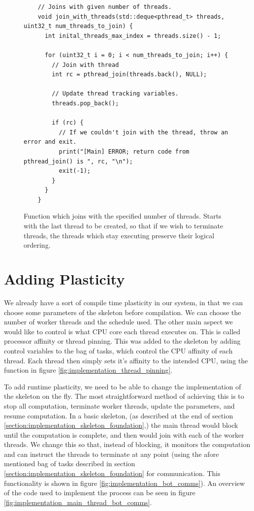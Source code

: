 \begin{figure}
	\begin{lstlisting}
	// Joins with given number of threads. 
	void join_with_threads(std::deque<pthread_t> threads, uint32_t num_threads_to_join) {
	  int inital_threads_max_index = threads.size() - 1;

	  for (uint32_t i = 0; i < num_threads_to_join; i++) {
	    // Join with thread
	    int rc = pthread_join(threads.back(), NULL);

	    // Update thread tracking variables.
	    threads.pop_back();

	    if (rc) {
	      // If we couldn't join with the thread, throw an error and exit.
	      print("[Main] ERROR; return code from pthread_join() is ", rc, "\n");
	      exit(-1);
	    }
	  }
	}
	\end{lstlisting}

	\caption{Function which joins with the specified number of threads. Starts with the last thread to be created, so that if we wish to terminate threads, the threads which stay executing preserve their logical ordering.}
	\label{fig:implementation_join_threads}
\end{figure}



\section{Adding Plasticity}
\label{section:implementation_adding_plasticity}

We already have a sort of compile time plasticity in our system, in that we can choose some parameters of the skeleton before compilation. We can choose the number of worker threads and the schedule used. The other main aspect we would like to control is what CPU core each thread executes on. This is called processor affinity or thread pinning. This was added to the skeleton by adding control variables to the bag of tasks, which control the CPU affinity of each thread. Each thread then simply sets it's affinity to the intended CPU, using the function in figure \ref{fig:implementation_thread_pinning}.

To add runtime plasticity, we need to be able to change the implementation of the skeleton on the fly. The most straightforward method of achieving this is to stop all computation, terminate worker threads, update the parameters, and resume computation. In a basic skeleton, (as described at the end of section \ref{section:implementation_skeleton_foundation},) the main thread would block until the computation is complete, and then would join with each of the worker threads. We change this so that, instead of blocking, it monitors the computation and can instruct the threads to terminate at any point (using the afore mentioned bag of tasks described in section \ref{section:implementation_skeleton_foundation} for communication. This functionality is shown in figure \ref{fig:implementation_bot_comms}). An overview of the code used to implement the process can be seen in figure \ref{fig:implementation_main_thread_bot_comms}.


